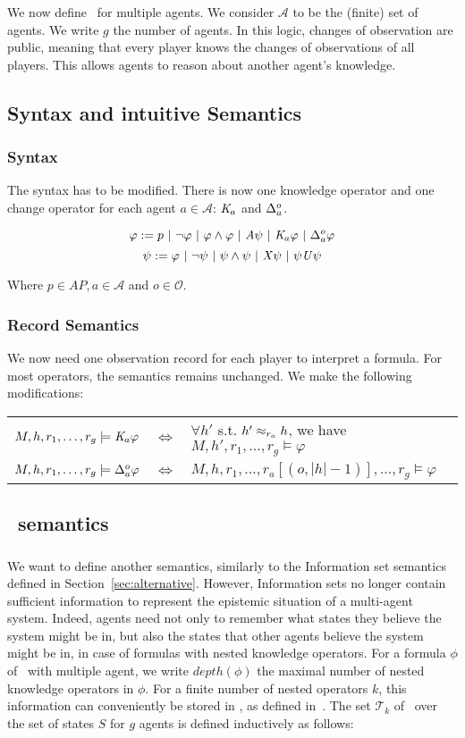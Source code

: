 We now define \ctlskd\ for multiple agents.
We consider $\mathcal{A}$ to be the (finite) set of agents. We write $g$ the number of agents.
In this logic, changes of observation are public, meaning that every player knows the changes of observations of all players.
This allows agents to reason about another agent's knowledge.

\subsection{Syntax and intuitive Semantics}
\subsubsection{Syntax}
The syntax has to be modified. There is now one knowledge operator and one change operator for each agent $a\in\mathcal{A}$: $\mathit{K}_a$ and $\Delta^{o}_a$.

$$\varphi := p ~|~ \neg \varphi ~|~ \varphi\wedge\varphi ~|~ \mathit{A}\psi ~|~ \mathit{K}_a\varphi ~|~ \Delta^{o}_a\varphi$$
$$\psi := \varphi ~|~ \neg\psi ~|~ \psi\wedge\psi ~|~ \mathit{X}\psi ~|~ \psi\mathit{U}\psi$$

Where $p\in AP, a\in\mathcal{A}$ and $o\in\mathcal{O}$.

\subsubsection{Record Semantics}
We now need one observation record for each player to interpret a formula. For most operators, the semantics remains unchanged. We make the following modifications:

\begin{tabular}{l c l}
$M,h,r_1,\dots,r_g \models\mathit{K}_a\varphi $&$ \iff $&$ \forall h'$ s.t. $h'\approx_{r_a}h$, we have $M,h',r_1,\dots,r_g\models\varphi$\\
$M,h,r_1,\dots,r_g \models \Delta^{o}_a\varphi$&$ \iff $&$ M,h,r_1,\dots,r_a[(o,|h|-1)],\dots,r_g\models\varphi$
\end{tabular}

\subsection{\ktrees\ semantics}
\subsubsection{\ktrees} We want to define another semantics, similarly to the Information set semantics defined in Section~\ref{sec:alternative}. However, Information sets no longer contain sufficient information to represent the epistemic situation of a multi-agent system. Indeed, agents need not only to remember what states they believe the system might be in, but also the states that other agents believe the system might be in, in case of formulas with nested knowledge operators. For a formula $\phi$ of \ctlskd\ with multiple agent, we write $\mathit{depth}(\phi)$ the maximal number of nested knowledge operators in $\phi$.
For a finite number of nested operators $k$, this information can conveniently be stored in \ktrees, as defined in~\cite{DBLP:conf/fsttcs/MeydenS99}.
The set $\mathcal{T}_k$ of \ktrees\ over the set of states $S$ for $g$ agents is defined inductively as follows:

